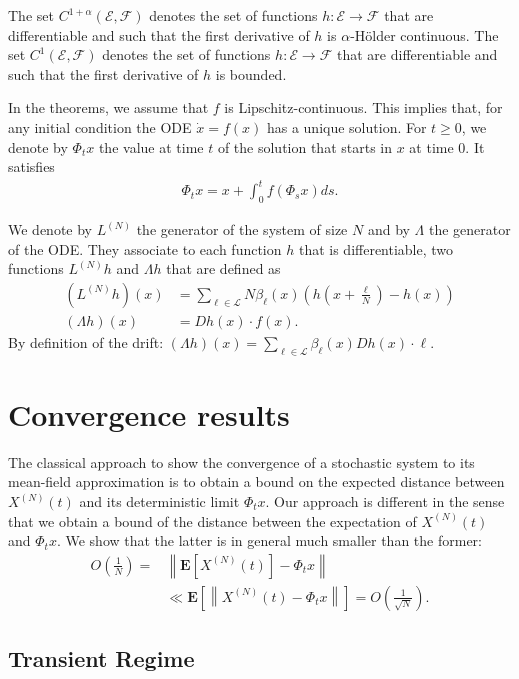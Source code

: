 \documentclass[sigconf]{acmart}
\newcommand\XN{X^{(N)}}
\newcommand\LN{L^{(N)}}
\newcommand\E{\mathcal{E}}
\newcommand\calL{\mathcal{L}}
\newcommand\calF{\mathcal{F}}
\newcommand\esp[1]{\mathbf{E}\left[#1\right]}
\newcommand\norm[1]{\left\|#1\right\|}
\newcommand\p[1]{\left(#1\right)}
\begin{document}
The set $C^{1+\alpha}(\E,\calF)$ denotes the set of functions
$h:\E\to\calF$ that are differentiable and such that the first
derivative of $h$ is $\alpha$-Hölder continuous.  The set
$C^1(\E,\calF)$ denotes the set of functions $h:\E\to\calF$ that are
differentiable and such that the first derivative of $h$ is bounded.

In the theorems, we assume that $f$ is Lipschitz-continuous. This
implies that, for any initial condition the ODE $\dot{x}=f(x)$ has a
unique solution. For $t\ge0$, we denote by $\Phi_tx$ the value at time
$t$ of the solution that starts in $x$ at time $0$. It satisfies
\begin{align*}
  \Phi_tx = x + \int_0^t f(\Phi_sx)ds. 
\end{align*}

We denote by $\LN$ the generator of the system of size $N$ and by
$\Lambda$ the generator of the ODE. They associate to each function
$h$ that is differentiable, two functions $\LN h$ and $\Lambda h$ that
are defined as 
\begin{align*}
  (\LN h) (x) &= \sum_{\ell\in\calL} N\beta_\ell(x) ( h(x+\frac{\ell}{N})-h(x) )\\
  (\Lambda h) (x) &= D h(x) \cdot f(x).
\end{align*}
By definition of the drift:
$(\Lambda h)(x)=\sum_{\ell\in\calL} \beta_\ell(x) D h(x) \cdot \ell$.


\section{Convergence results}
\label{sec:convergence}

The classical approach to show the convergence of a stochastic system
to its mean-field approximation is to obtain a bound on the expected
distance between $\XN(t)$ and its deterministic limit $\Phi_tx$.
Our approach is different in the sense that we obtain a bound of the
distance between the expectation of $\XN(t)$ and $\Phi_tx$. We show
that the latter is in general much smaller than the former:
\begin{align*}
  O\p{\frac1N} =& \norm{\esp{\XN(t)} - \Phi_t x}\\
               &\ll \esp{\norm{\XN(t) - \Phi_t x}} =
                 O\p{\frac1{\sqrt{N}}}. 
\end{align*}


\subsection{Transient Regime}
\label{sec:transient}
\end{document}
